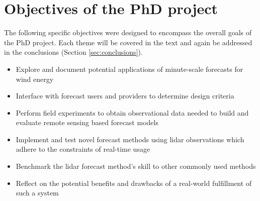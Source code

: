 \chapter{Objectives of the PhD project}
\label{sec:objectives}

The following specific objectives were designed to encompass the overall goals of the PhD project. Each theme will be covered in the text and again be addressed in the conclusions (Section \ref{sec:conclusions}).

\vspace{0.5cm}

\begin{itemize}
    \item Explore and document potential applications of minute-scale forecasts for wind energy
    \item Interface with forecast users and providers to determine design criteria
    \item Perform field experiments to obtain observational data needed to build and evaluate remote sensing based forecast models
    \item Implement and test novel forecast methods using lidar observations which adhere to the constraints of real-time usage
    \item Benchmark the lidar forecast method's skill to other commonly used methods
    \item Reflect on the potential benefits and drawbacks of a real-world fulfillment of such a system
\end{itemize}